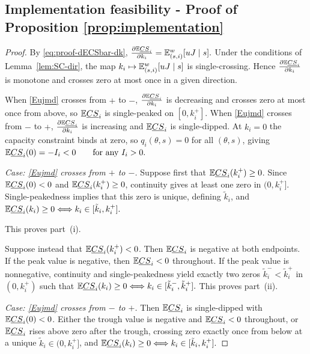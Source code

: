 \documentclass{class}
\begin{document}

\subsection{Implementation feasibility - Proof of Proposition \ref{prop:implementation}}\label{proof:implementation}


\begin{proof}

By \ref{eq:proof-dECSbar-dk}, $\frac{\partial \mathbb{E}\underline{CS}_i}{\partial k_i} = \mathbb{E}_{(s,i)}^w[uJ\mid s].$
Under the conditions of Lemma~\ref{lem:SC-dir}, the map $k_i\mapsto \mathbb{E}_{(s,i)}^w[uJ\mid s]$ is single-crossing. Hence $\frac{\partial \mathbb{E}\underline{CS}_i}{\partial k_i}$ is monotone and crosses zero at most once in a given direction.

When \ref{Eujmd} crosses from $+$ to $-$, $\frac{\partial \mathbb{E}\underline{CS}_i}{\partial k_i}$ is decreasing and crosses zero at most once from above, so $\mathbb{E}\underline{CS}_i$ is single-peaked on $[0,k_i^+]$. When \ref{Eujmd} crosses from $-$ to $+$, $\frac{\partial \mathbb{E}\underline{CS}_i}{\partial k_i}$ is increasing and $\mathbb{E}\underline{CS}_i$ is single-dipped. At $k_i=0$ the capacity constraint binds at zero, so $q_i(\theta,s)=0$ for all $(\theta,s)$, giving
$\mathbb{E}\underline{CS}_i(0)=-I_i<0 \qquad \text{for any }I_i>0.$

\noindent\textit{Case: \ref{Eujmd} crosses from $+$ to $-$.}
Suppose first that $\mathbb{E}\underline{CS}_i(k_i^+)\ge 0$. Since $\mathbb{E}\underline{CS}_i(0)<0$ and $\mathbb{E}\underline{CS}_i(k_i^+)\ge 0$, continuity gives at least one zero in $(0,k_i^+]$. Single-peakedness implies that this zero is unique, defining $\tilde k_i$, and
$\mathbb{E}\underline{CS}_i(k_i)\ge 0 \Longleftrightarrow k_i\in[\tilde k_i,k_i^+].$

This proves part~(i).

Suppose instead that $\mathbb{E}\underline{CS}_i(k_i^+)<0$. Then $\mathbb{E}\underline{CS}_i$ is negative at both endpoints. If the peak value is negative, then $\mathbb{E}\underline{CS}_i<0$ throughout. If the peak value is nonnegative, continuity and single-peakedness yield exactly two zeros
$\tilde k_i^-<\tilde k_i^+$
in $(0,k_i^+)$ such that
$\mathbb{E}\underline{CS}_i(k_i)\ge 0 \Longleftrightarrow k_i\in[\tilde k_i^-,\tilde k_i^+].$
This proves part~(ii).

\noindent\textit{Case: \ref{Eujmd} crosses from $-$ to $+$.}
Then $\mathbb{E}\underline{CS}_i$ is single-dipped with $\mathbb{E}\underline{CS}_i(0)<0$. Either the trough value is negative and $\mathbb{E}\underline{CS}_i<0$ throughout, or $\mathbb{E}\underline{CS}_i$ rises above zero after the trough, crossing zero exactly once from below at a unique $\tilde k_i\in(0,k_i^+]$, and
$\mathbb{E}\underline{CS}_i(k_i)\ge 0 \Longleftrightarrow k_i\in[\tilde k_i,k_i^+].$
\end{proof}
\end{document}
